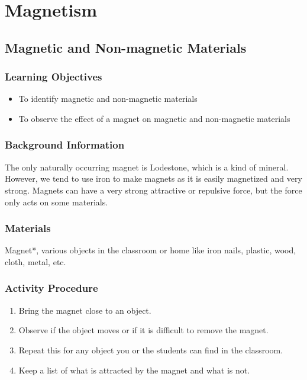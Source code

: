 \section{Magnetism}

\subsection{Magnetic and Non-magnetic Materials}

\subsubsection*{Learning Objectives}
\begin{itemize}
\item{To identify magnetic and non-magnetic materials} 
\item{To observe the effect of a magnet on magnetic and non-magnetic materials} 
\end{itemize}

\subsubsection*{Background Information}
The only naturally occurring magnet is Lodestone, which is a kind of mineral. However, we tend to use iron to make magnets as it is easily magnetized and very strong. Magnets can have a very strong attractive or repulsive force, but the force only acts on some materials.

\subsubsection*{Materials}
Magnet*, various objects in the classroom or home like iron nails, plastic, wood, cloth, metal, etc.  


\subsubsection*{Activity Procedure}
\begin{enumerate}
\item{Bring the magnet close to an object.} 
\item{Observe if the object moves or if it is difficult to remove the magnet.} 
\item{Repeat this for any object you or the students can find in the classroom.} 
\item{Keep a list of what is attracted by the magnet and what is not.} 
\end{enumerate}

